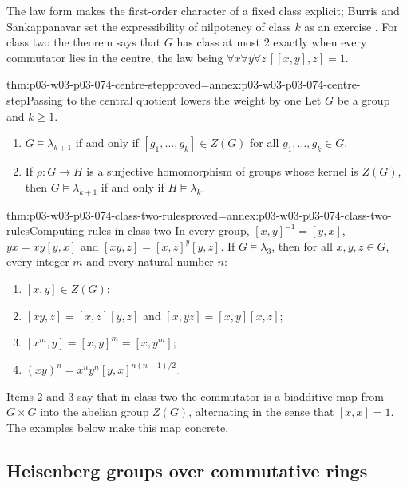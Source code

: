 The law form makes the first-order character of a fixed class explicit;
Burris and Sankappanavar set the expressibility of nilpotency of class
\(k\) as an exercise \cite[Chapter~V, \S1, Exercise~5(c), p.~201]{BurrisSankappanavar2012}.
For class two the theorem says that \(G\) has class at most \(2\) exactly
when every commutator lies in the centre, the law being
\(\forall x\forall y\forall z\,[[x,y],z]=1\).

\begin{hblemma}{thm:p03-w03-p03-074-centre-step}{proved=annex:p03-w03-p03-074-centre-step}{Passing to the central quotient lowers the weight by one}
Let \(G\) be a group and \(k\ge1\).
\begin{enumerate}
  \item \(G\models\lambda_{k+1}\) if and only if
        \([g_1,\ldots,g_k]\in Z(G)\) for all \(g_1,\ldots,g_k\in G\).
  \item If \(\rho:G\to H\) is a surjective homomorphism of groups whose
        kernel is \(Z(G)\), then \(G\models\lambda_{k+1}\) if and only if
        \(H\models\lambda_k\).
\end{enumerate}
\end{hblemma}

\begin{hblemma}{thm:p03-w03-p03-074-class-two-rules}{proved=annex:p03-w03-p03-074-class-two-rules}{Computing rules in class two}
In every group, \([x,y]^{-1}=[y,x]\), \(yx=xy[y,x]\) and
\([xy,z]=[x,z]^y[y,z]\). If \(G\models\lambda_3\), then for all
\(x,y,z\in G\), every integer \(m\) and every natural number \(n\):
\begin{enumerate}
  \item \([x,y]\in Z(G)\);
  \item \([xy,z]=[x,z][y,z]\) and \([x,yz]=[x,y][x,z]\);
  \item \([x^m,y]=[x,y]^m=[x,y^m]\);
  \item \((xy)^n=x^ny^n[y,x]^{n(n-1)/2}\).
\end{enumerate}
\end{hblemma}

Items 2 and 3 say that in class two the commutator is a biadditive map
from \(G\times G\) into the abelian group \(Z(G)\), alternating in the
sense that \([x,x]=1\). The examples below make this map concrete.

\subsection{Heisenberg groups over commutative rings}
\label{sec:p03-w03-p03-074-heisenberg}

